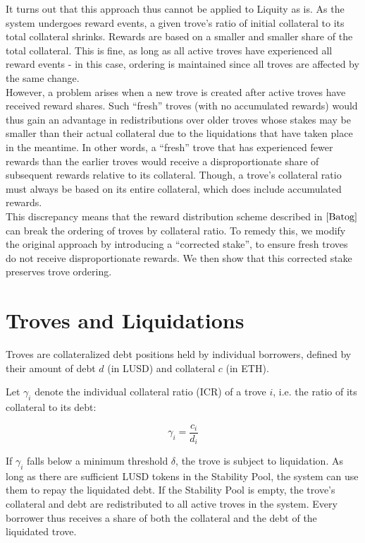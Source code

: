 \documentclass[reqno]{article}
\begin{document}
It turns out that this approach thus cannot be applied to Liquity as is. As the system undergoes reward events, a given trove’s ratio of initial collateral to its total collateral shrinks. Rewards are based on a smaller and smaller share of the total collateral. This is fine, as long as all active troves have experienced all reward events - in this case, ordering is maintained since all troves are affected by the same change. \\

However, a problem arises when a new trove is created after active troves have received reward shares.  Such “fresh” troves (with no accumulated rewards) would thus gain an advantage in redistributions over older troves whose stakes may be smaller than their actual collateral due to the liquidations that have taken place in the meantime. In other words, a “fresh” trove that has experienced fewer rewards than the earlier troves would receive a disproportionate share of subsequent rewards relative to its collateral. Though, a trove's collateral ratio must always be based on its entire collateral, which does include accumulated rewards.  \\

This discrepancy means that the reward distribution scheme described in $\cite{Batog}$ can break the ordering of troves by collateral ratio. To remedy this, we modify the original approach by introducing a “corrected stake”, to ensure fresh troves do not receive disproportionate rewards. We then show that this corrected stake preserves trove ordering. \\


\section{Troves and Liquidations}
Troves are collateralized debt positions held by individual borrowers, defined by their amount of debt $d$ (in LUSD) and collateral $c$ (in ETH).

Let $\gamma_i$ denote the individual collateral ratio (ICR) of a trove $i$, i.e. the ratio of its collateral to its debt:

\begin{equation}
    \gamma_i = \frac{c_i} {d_i}
\end{equation}

If $\gamma_i$ falls below a minimum threshold $\delta$, the trove is subject to liquidation. As long as there are sufficient LUSD tokens in the Stability Pool, the system can use them to repay the liquidated debt. If the Stability Pool is empty, the trove's collateral and debt are redistributed to all active troves in the system. Every borrower thus receives a share of both the collateral and the debt of the liquidated trove.
\end{document}
